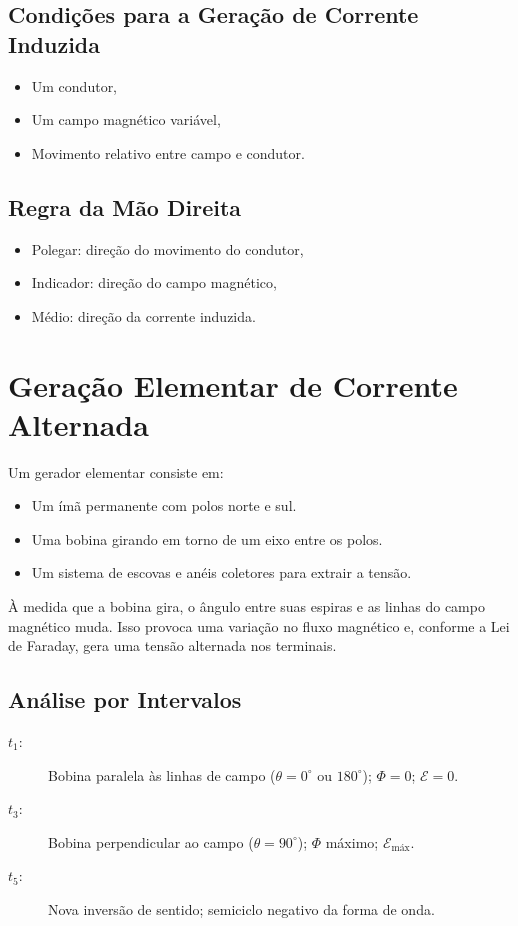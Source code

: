 \subsection{Condições para a Geração de Corrente Induzida}
\begin{itemize}
  \item Um condutor,
  \item Um campo magnético variável,
  \item Movimento relativo entre campo e condutor.
\end{itemize}

\subsection{Regra da Mão Direita}
\begin{itemize}
  \item Polegar: direção do movimento do condutor,
  \item Indicador: direção do campo magnético,
  \item Médio: direção da corrente induzida.
\end{itemize}


\section{Geração Elementar de Corrente Alternada}

Um gerador elementar consiste em:
\begin{itemize}
  \item Um ímã permanente com polos norte e sul.
  \item Uma bobina girando em torno de um eixo entre os polos.
  \item Um sistema de escovas e anéis coletores para extrair a tensão.
\end{itemize}

À medida que a bobina gira, o ângulo entre suas espiras e as linhas do campo magnético muda. Isso provoca uma variação no fluxo magnético e, conforme a Lei de Faraday, gera uma tensão alternada nos terminais.

\subsection{Análise por Intervalos}

\begin{description}
  \item[\(t_1\):] Bobina paralela às linhas de campo (\(\theta = 0^\circ\) ou \(180^\circ\)); \(\Phi = 0\); \(\mathcal{E} = 0\).
  \item[\(t_3\):] Bobina perpendicular ao campo (\(\theta = 90^\circ\)); \(\Phi\) máximo; \(\mathcal{E}_{\text{máx}}\).
  \item[\(t_5\):] Nova inversão de sentido; semiciclo negativo da forma de onda.
\end{description}

